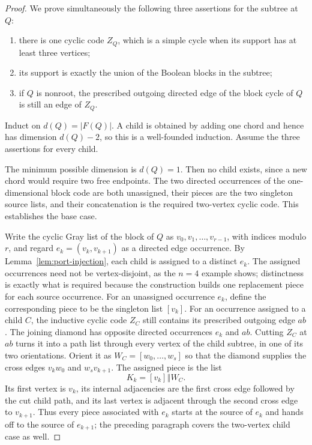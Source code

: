 \documentclass[12pt]{article}
\begin{document}
\begin{proof}
We prove simultaneously the following three assertions for the subtree at
$Q$:
\begin{enumerate}
\item there is one cyclic code $Z_Q$, which is a simple cycle when its support
has at least three vertices;
\item its support is exactly the union of the Boolean blocks in the subtree;
\item if $Q$ is nonroot, the prescribed outgoing directed edge of the block
cycle of $Q$ is still an edge of $Z_Q$.
\end{enumerate}
Induct on $d(Q)=|F(Q)|$.  A child is obtained by adding one chord and hence
has dimension $d(Q)-2$, so this is a well-founded induction.  Assume the
three assertions for every child.

The minimum possible dimension is $d(Q)=1$.  Then no child exists, since a
new chord would require two free endpoints.  The two directed occurrences of
the one-dimensional block code are both unassigned, their pieces are the two
singleton source lists, and their concatenation is the required two-vertex
cyclic code.  This establishes the base case.

Write the cyclic Gray list of the block of $Q$ as
$v_0,v_1,\ldots,v_{r-1}$, with indices modulo $r$, and regard
$e_k=(v_k,v_{k+1})$ as a directed edge occurrence.  By
Lemma~\ref{lem:port-injection}, each child is assigned to a distinct $e_k$.
The assigned occurrences need not be vertex-disjoint, as the $n=4$ example
shows; distinctness is exactly what is required because the construction
builds one replacement piece for each source occurrence.
For an unassigned occurrence $e_k$, define the corresponding piece to be the
singleton list $[v_k]$.  For an occurrence assigned to a child $C$, the
inductive cyclic code $Z_C$ still contains its prescribed outgoing edge $ab$.
The joining diamond has opposite directed occurrences $e_k$ and $ab$.
Cutting $Z_C$ at $ab$ turns it into a path list through every vertex of the
child subtree, in one of its two orientations.  Orient it as
$W_C=[w_0,\ldots,w_s]$ so that the diamond supplies the cross edges
$v_kw_0$ and $w_sv_{k+1}$.  The assigned piece is the list
\[
 K_k=[v_k]\mathbin{\Vert}W_C.
\]
Its first vertex is $v_k$, its internal adjacencies are the first cross edge
followed by the cut child path, and its last vertex is adjacent through the
second cross edge to $v_{k+1}$.  Thus every piece associated with $e_k$
starts at the source of $e_k$ and hands off to the source of $e_{k+1}$; the
preceding paragraph covers the two-vertex child case as well.


\end{proof}
\end{document}
